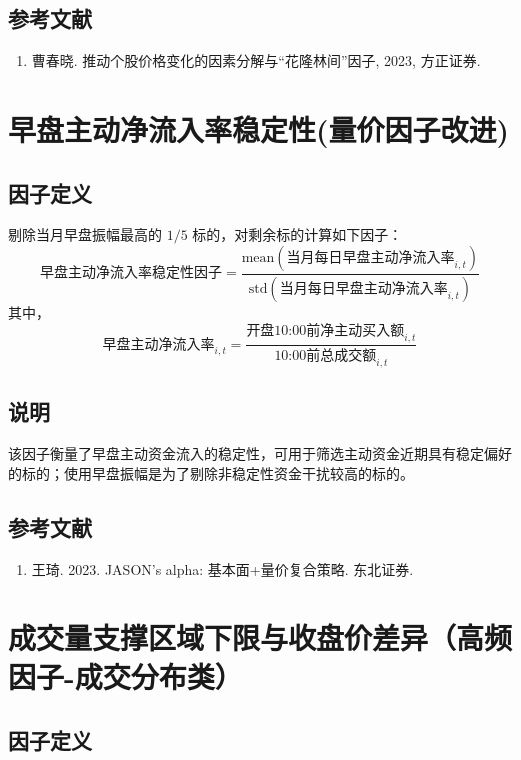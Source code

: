 \documentclass{article}
\begin{document}
\subsection{参考文献}
\begin{enumerate}
    \item 曹春晓. 推动个股价格变化的因素分解与“花隆林间”因子, 2023, 方正证券.
\end{enumerate}

\section{早盘主动净流入率稳定性(量价因子改进)}

\subsection{因子定义}
剔除当月早盘振幅最高的 \(1/5\) 标的，对剩余标的计算如下因子：
\begin{equation}
    \text{早盘主动净流入率稳定性因子}=\frac{\mathrm{mean}(\text{当月每日早盘主动净流入率}_{i,t})}{\mathrm{std}(\text{当月每日早盘主动净流入率}_{i,t})}
\end{equation}
其中，
\begin{equation}
    \text{早盘主动净流入率}_{i,t} = \frac{\text{开盘10:00前净主动买入额}_{i,t}}{\text{10:00前总成交额}_{i,t}}
\end{equation}

\subsection{说明}
该因子衡量了早盘主动资金流入的稳定性，可用于筛选主动资金近期具有稳定偏好的标的；使用早盘振幅是为了剔除非稳定性资金干扰较高的标的。

\subsection{参考文献}
\begin{enumerate}
    \item 王琦. 2023. JASON's alpha: 基本面+量价复合策略. 东北证券.
\end{enumerate}

\section{成交量支撑区域下限与收盘价差异（高频因子-成交分布类）}

\subsection{因子定义}
\end{document}
